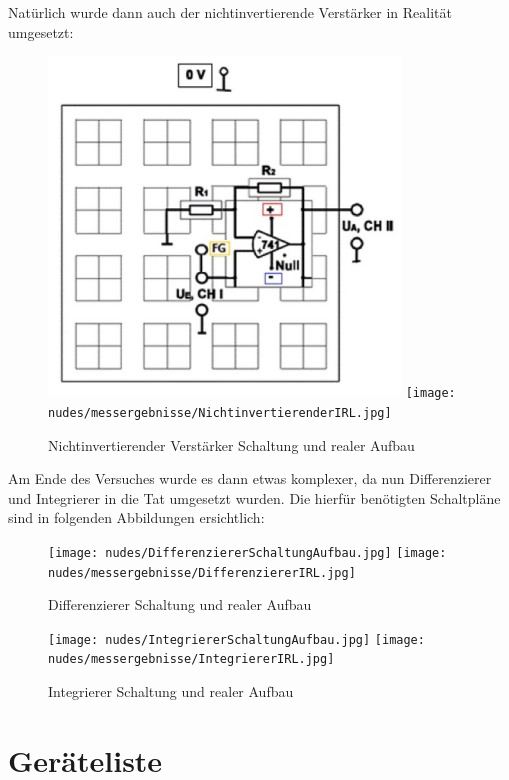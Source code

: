 \documentclass[12pt,a4paper,twoside]{article}
\begin{document}
\noindent
Natürlich wurde dann auch der nichtinvertierende Verstärker in Realität umgesetzt:

\begin{figure}[H]
    \centering
    \includegraphics[width=0.4\linewidth]{nudes/NichtInvertierenderVerstärkerSchaltungAufbau.jpg}
    \texttt{[image: nudes/messergebnisse/NichtinvertierenderIRL.jpg]}
    \caption{Nichtinvertierender Verstärker Schaltung und realer Aufbau \cite{teachcenter2}}
    \label{fig:SchaltungNichtInvertierenderVerstärker}
\end{figure}

\noindent
Am Ende des Versuches wurde es dann etwas komplexer, da nun Differenzierer und Integrierer in die Tat umgesetzt wurden. Die hierfür benötigten Schaltpläne sind in folgenden Abbildungen ersichtlich: 

\begin{figure}[H]
    \centering
    \texttt{[image: nudes/DifferenziererSchaltungAufbau.jpg]}
    \texttt{[image: nudes/messergebnisse/DifferenziererIRL.jpg]}
    \caption{Differenzierer Schaltung und realer Aufbau \cite{teachcenter2}}
    \label{fig:SchaltungDifferenzierer}
\end{figure}

\begin{figure}[H]
    \centering
    \texttt{[image: nudes/IntegriererSchaltungAufbau.jpg]}
    \texttt{[image: nudes/messergebnisse/IntegriererIRL.jpg]}
    \caption{Integrierer Schaltung und realer Aufbau \cite{teachcenter2}}
    \label{fig:SchaltungIntegrierer}
\end{figure}



\section{Geräteliste} %
\end{document}
